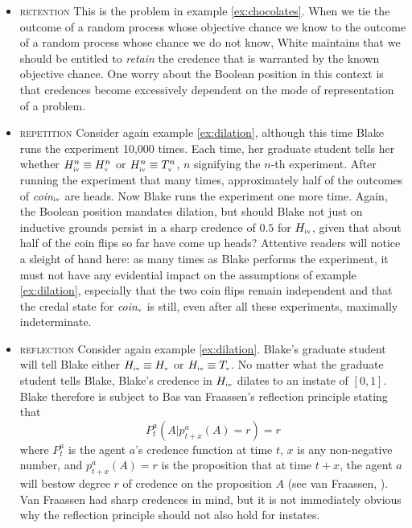 \documentclass[11pt]{article}
\begin{document}
\begin{itemize}
\item \textsc{retention} This is the problem in example
  \ref{ex:chocolates}. When we tie the outcome of a random process
  whose objective chance we know to the outcome of a random process
  whose chance we do not know, White maintains that we should be
  entitled to \emph{retain} the credence that is warranted by the
  known objective chance. One worry about the Boolean position in this
  context is that credences become excessively dependent on the mode
  of representation of a problem.
\item \textsc{repetition} Consider again example \ref{ex:dilation},
  although this time Blake runs the experiment 10,000 times. Each
  time, her graduate student tells her whether
  $H^{n}_{\mbox{\tiny{iv}}}\equiv{}H^{n}_{\mbox{\tiny{v}}}$ or
  $H^{n}_{\mbox{\tiny{iv}}}\equiv{}T^{n}_{\mbox{\tiny{v}}}$, $n$
  signifying the $n$-th experiment. After running the experiment that
  many times, approximately half of the outcomes of
  \textit{coin}$_{\mbox{\tiny{iv}}}$ are heads. Now Blake runs the
  experiment one more time. Again, the Boolean position mandates
  dilation, but should Blake not just on inductive grounds persist in
  a sharp credence of $0.5$ for $H_{\mbox{\tiny{iv}}}$, given that
  about half of the coin flips so far have come up heads? Attentive
  readers will notice a sleight of hand here: as many times as Blake
  performs the experiment, it must not have any evidential impact on
  the assumptions of example \ref{ex:dilation}, especially that the
  two coin flips remain independent and that the credal state for 
  \textit{coin}$_{\mbox{\tiny{v}}}$ is still, even after all these
  experiments, maximally indeterminate. 
\item \textsc{reflection} Consider again example \ref{ex:dilation}.
  Blake's graduate student will tell Blake either
  $H_{\mbox{\tiny{iv}}}\equiv{}H_{\mbox{\tiny{v}}}$ or
  $H_{\mbox{\tiny{iv}}}\equiv{}T_{\mbox{\tiny{v}}}$. No matter what
  the graduate student tells Blake, Blake's credence in
  $H_{\mbox{\tiny{iv}}}$ dilates to an instate of $[0,1]$. Blake
  therefore is subject to Bas van Fraassen's reflection principle
  stating that
  \begin{equation}
    \label{eq:reflection}
    P_{t}^{a}(A|p_{t+x}^{a}(A)=r)=r
  \end{equation}
  where $P_{t}^{a}$ is the agent $a$'s credence function at time $t$,
  $x$ is any non-negative number, and $p_{t+x}^{a}(A)=r$ is the
  proposition that at time $t+x$, the agent $a$ will bestow degree $r$
  of credence on the proposition $A$ (see van
  Fraassen, ). Van Fraassen had sharp
  credences in mind, but it is not immediately obvious why the
  reflection principle should not also hold for instates.
\end{itemize}
\end{document}
